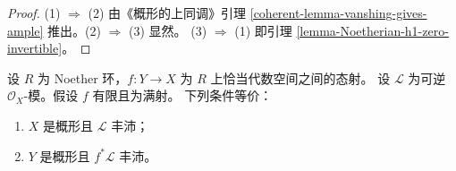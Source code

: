 \begin{proof}
(1) $\Rightarrow$ (2) 由《概形的上同调》引理
\ref{coherent-lemma-vanshing-gives-ample} 推出。(2) $\Rightarrow$ (3) 显然。
(3) $\Rightarrow$ (1) 即引理 \ref{lemma-Noetherian-h1-zero-invertible}。
\end{proof}

\begin{lemma}
\label{lemma-surjective-finite-morphism-ample}
设 $R$ 为 Noether 环，$f : Y \to X$ 为 $R$ 上恰当代数空间之间的态射。
设 $\mathcal{L}$ 为可逆 $\mathcal{O}_X$-模。假设 $f$ 有限且为满射。
下列条件等价：
\begin{enumerate}
\item $X$ 是概形且 $\mathcal{L}$ 丰沛；
\item $Y$ 是概形且 $f^*\mathcal{L}$ 丰沛。
\end{enumerate}
\end{lemma}

